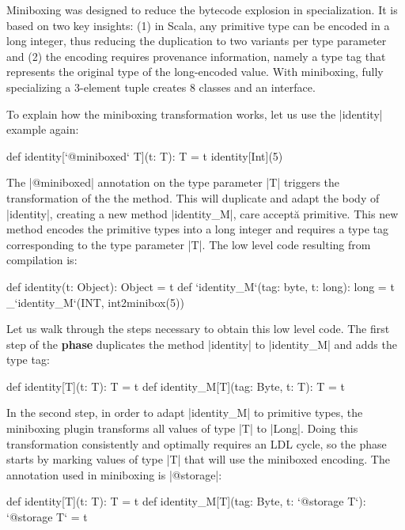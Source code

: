 Miniboxing \cite{miniboxing} was designed to reduce the bytecode explosion in specialization. It is based on two key insights: (1) in Scala, any primitive type can be encoded in a long integer, thus reducing the duplication to two variants per type parameter and (2) the encoding requires provenance information, namely a type tag that represents the original type of the long-encoded value. With miniboxing, fully specializing a 3-element tuple creates 8 classes and an interface.

To explain how the miniboxing transformation works, let us use the |identity| example again:

\begin{lstlisting-nobreak}
 def identity[`@miniboxed` T](t: T): T = t
 identity[Int](5)
\end{lstlisting-nobreak}

The |@miniboxed| annotation on the type parameter |T| triggers the transformation of the the method. This will duplicate and adapt the body of |identity|, creating a new method |identity_M|, care accept\u{a} primitive. This new method encodes the primitive types into a long integer and requires a type tag corresponding to the type parameter |T|. The low level code resulting from compilation is:

\begin{lstlisting-nobreak}
 def identity(t: Object): Object = t
 def `identity_M`(tag: byte, t: long): long = t
_`identity_M`(INT, int2minibox(5))
\end{lstlisting-nobreak}

Let us walk through the steps necessary to obtain this low level code. The first step of the \textbf{\inject{} phase} duplicates the method |identity| to |identity_M| and adds the type tag:

\begin{lstlisting-nobreak}
 def identity[T](t: T): T = t
 def identity_M[T](tag: Byte, t: T): T = t
\end{lstlisting-nobreak}

In the second step, in order to adapt |identity_M| to primitive types, the miniboxing plugin transforms all values of type |T| to |Long|. Doing this transformation consistently and optimally requires an LDL cycle, so the \inject{} phase starts by marking values of type |T| that will use the miniboxed encoding. The annotation used in miniboxing is |@storage|:

\begin{lstlisting-nobreak}
 def identity[T](t: T): T = t
 def identity_M[T](tag: Byte, t: `@storage T`): `@storage T` = t
\end{lstlisting-nobreak}

